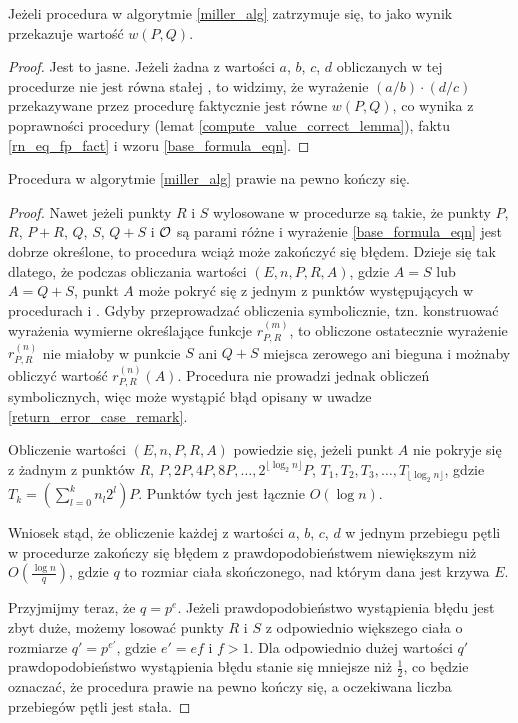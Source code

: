 \begin{theorem}
Jeżeli procedura  w algorytmie \ref{miller_alg}
zatrzymuje się,
to jako wynik przekazuje wartość $w(P, Q)$.
\end{theorem}

\begin{proof}
Jest to jasne. Jeżeli żadna z wartości $a$, $b$, $c$, $d$
obliczanych w tej procedurze nie jest równa stałej ,
to widzimy, że wyrażenie $(a/b)\cdot(d/c)$ przekazywane przez procedurę
faktycznie jest równe $w(P, Q)$,
co wynika z poprawności procedury 
(lemat \ref{compute_value_correct_lemma}),
faktu \ref{rn_eq_fp_fact}
i wzoru \ref{base_formula_eqn}.
\end{proof}

\begin{theorem}
Procedura  w algorytmie \ref{miller_alg}
prawie na pewno kończy się.
\end{theorem}

\begin{proof}
Nawet jeżeli punkty $R$ i $S$ wylosowane w procedurze 
są takie, że punkty $P$, $R$, $P+R$, $Q$, $S$, $Q+S$ i $\mathcal{O}$
są parami różne
i wyrażenie \ref{base_formula_eqn} jest dobrze określone,
to procedura  wciąż może zakończyć się błędem.
Dzieje się tak dlatego,
że podczas obliczania wartości $(E, n, P, R, A)$,
gdzie $A = S$ lub $A = Q+S$,
punkt $A$ może pokryć się z jednym z punktów
występujących w procedurach
 i .
Gdyby przeprowadzać obliczenia symbolicznie,
tzn. konstruować wyrażenia wymierne określające funkcje $r_{P,R}^{(m)}$,
to obliczone ostatecznie wyrażenie $r_{P,R}^{(n)}$
nie miałoby w punkcie $S$ ani $Q+S$ miejsca zerowego ani bieguna
i możnaby obliczyć wartość $r_{P,R}^{(n)}(A)$.
Procedura  nie prowadzi jednak obliczeń symbolicznych,
więc może wystąpić błąd opisany w uwadze \ref{return_error_case_remark}.

\noindent
Obliczenie wartości $(E, n, P, R, A)$ powiedzie się,
jeżeli punkt $A$ nie pokryje się z żadnym z punktów
$R$, $P, 2P, 4P, 8P, \ldots, 2^{\lfloor\log_2 n\rfloor}P$,
$T_1, T_2, T_3, \ldots, T_{\lfloor\log_2 n\rfloor}$,
gdzie $T_k = \left(\sum_{l=0}^k n_l2^l\right)P$.
Punktów tych jest łącznie $O(\log n)$.

\noindent
Wniosek stąd, że obliczenie każdej z wartości $a$, $b$, $c$, $d$
w jednym przebiegu pętli  w procedurze 
zakończy się błędem
z prawdopodobieństwem niewiększym niż $O(\frac{\log n}{q})$,
gdzie $q$ to rozmiar ciała skończonego, nad którym dana jest krzywa $E$.

\noindent
Przyjmijmy teraz, że $q = p^e$.
Jeżeli prawdopodobieństwo wystąpienia błędu jest zbyt duże,
możemy losować punkty $R$ i $S$ z odpowiednio większego ciała
o rozmiarze $q' = p^{e'}$, gdzie $e' = ef$ i $f > 1$.
Dla odpowiednio dużej wartości $q'$
prawdopodobieństwo wystąpienia błędu
stanie się mniejsze niż $\frac{1}{2}$,
co będzie oznaczać,
że procedura  prawie na pewno kończy się,
a oczekiwana liczba przebiegów pętli  jest stała.
\end{proof}

